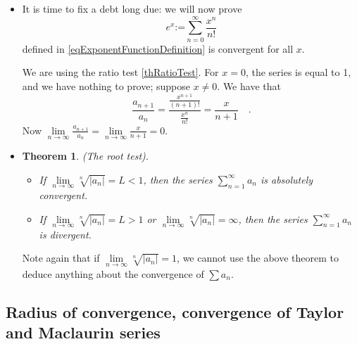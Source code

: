 \documentclass[12pt]{book}
\newcommand{\eqdef}{\textbf{:=}}
\newenvironment{proof}[1][]{ \textbf{Proof#1.} }{$\Box$\medskip}
\newtheorem{theorem}{Theorem}[section]
\begin{document}
\begin{itemize}
\begin{proof}[ of Theorem \ref{thRatioTest}]
Suppose next $\lim\limits_{n\to\infty}\left|\frac{a_{n+1}}{a_{n}}\right|= L>1 $. We note that the proof is very similar to the preceding one, only inequalities must be reversed.

Let $M$ be an arbitrary number with $L>M>1$ (for example, $M=\frac{1+L}2$ works). As $\lim\limits_{n\to\infty} \left| \frac{a_{n+1}}{a_{n}} \right|=L$ for sufficiently large $n$ we have that $\left|\frac{a_{n+1}}{a_{n}} \right|> M$. More precisely, there exists an index $N$ such that for all $n\geq N$ we have that
\[
|a_{n+1}|> Ma_{n}\quad .
\]
Therefore 
\[
|a_{N+k}|>M |a_{N+k-1}|> M^2 |a_{N+k-2}|>\dots >M^k |a_N|\quad .
\]
Therefore 
\[
\sum_{n\geq N} |a_{n}|>\sum_{k=0}^{\infty} |a_N|M^{k}= \lim_{k\to \infty} \frac{|a_N|(M^k-1)}{M-1}=\infty.
\] 
Our criterion now follows from Theorem \ref{thSeriesComparisonTest}.
\end{proof}

\item {} It is time to fix a debt long due: we will now prove 
\[
e^x\eqdef \sum_{n=0}^\infty \frac{x^n}{n!} 
\]
defined in \ref{eqExponentFunctionDefinition} is convergent for all $x$. 

We are using the ratio test \ref{thRatioTest}. For $x=0$, the series is equal to 1, and we have nothing to prove; suppose $x\neq 0$.  We have that 
\[
\frac{a_{n+1}}{a_{n}}= \frac{\frac{x^{n+1}}{(n+1)!}}{\frac{x^{n}}{n!}} = \frac{x}{n+1}\quad .
\]
Now $\lim\limits_{n\to \infty} \frac{a_{n+1}}{a_{n}}= \lim\limits_{n\to \infty} \frac{x}{n+1}=0$.

\item \begin{theorem}\label{thRootTest}(The root test). 
\begin{itemize}
\item If $\lim\limits_{n\to\infty}\sqrt[n]{|a_n|}= L<1$, then the series $\sum\limits_{n=1}^\infty a_n$ is absolutely convergent.
\item If $\lim\limits_{n\to\infty}\sqrt[n]{|a_n|}= L>1$ or $\lim\limits_{n\to\infty}\sqrt[n]{|a_n|}=\infty$, then the series $\sum\limits_{n=1}^\infty a_n$ is divergent.
\end{itemize}
\end{theorem}
Note again that if $\lim\limits_{n\to\infty}\sqrt[n]{|a_n|}= 1$, we cannot use the above theorem to deduce anything about the convergence of $\sum a_n$.
\end{itemize}
\subsection{Radius of convergence, convergence of Taylor and Maclaurin series}\label{secTaylorSeriesRadiusConvergence}
\end{document}

